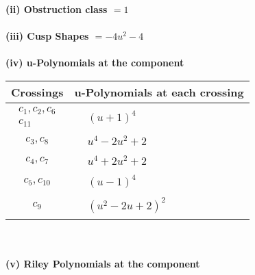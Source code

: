 \documentclass[1p]{elsarticle_modified}
\theoremstyle{definition}
\begin{document}
\flushleft \textbf{(ii) Obstruction class $= 1$}\\~\\
\flushleft \textbf{(iii) Cusp Shapes $= -4 u^2-4$}\\~\\
\newpage\renewcommand{\arraystretch}{1}
\flushleft \textbf{(iv) u-Polynomials at the component}\newline \\
\begin{tabular}{m{50pt}|m{274pt}}
Crossings & \hspace{64pt}u-Polynomials at each crossing \\
\hline $$\begin{aligned}c_{1},c_{2},c_{6}\\c_{11}\end{aligned}$$&$\begin{aligned}
&(u+1)^4
\end{aligned}$\\
\hline $$\begin{aligned}c_{3},c_{8}\end{aligned}$$&$\begin{aligned}
&u^4-2 u^2+2
\end{aligned}$\\
\hline $$\begin{aligned}c_{4},c_{7}\end{aligned}$$&$\begin{aligned}
&u^4+2 u^2+2
\end{aligned}$\\
\hline $$\begin{aligned}c_{5},c_{10}\end{aligned}$$&$\begin{aligned}
&(u-1)^4
\end{aligned}$\\
\hline $$\begin{aligned}c_{9}\end{aligned}$$&$\begin{aligned}
&(u^2-2 u+2)^2
\end{aligned}$\\
\hline
\end{tabular}\\~\\
\newpage\renewcommand{\arraystretch}{1}
\flushleft \textbf{(v) Riley Polynomials at the component}\newline \\
\end{document}
